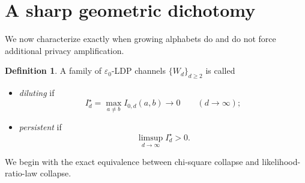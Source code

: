 \documentclass[11pt]{amsart}
\numberwithin{equation}{section}
\theoremstyle{definition}
\newtheorem{definition}[theorem]{Definition}
\begin{document}
\section{A sharp geometric dichotomy}\label{sec:dichotomy}

We now characterize exactly when growing alphabets do and do not force additional privacy amplification.

\begin{definition}
A family of $\varepsilon_0$-LDP channels $\{W_d\}_{d\ge2}$ is called
\begin{itemize}
\item \emph{diluting} if
\[
I_d^\star=\max_{a\neq b} I_{0,d}(a,b)\longrightarrow 0 \qquad (d\to\infty);
\]
\item \emph{persistent} if
\[
\limsup_{d\to\infty} I_d^\star >0.
\]
\end{itemize}
\end{definition}

We begin with the exact equivalence between chi-square collapse and likelihood-ratio-law collapse.
\end{document}

